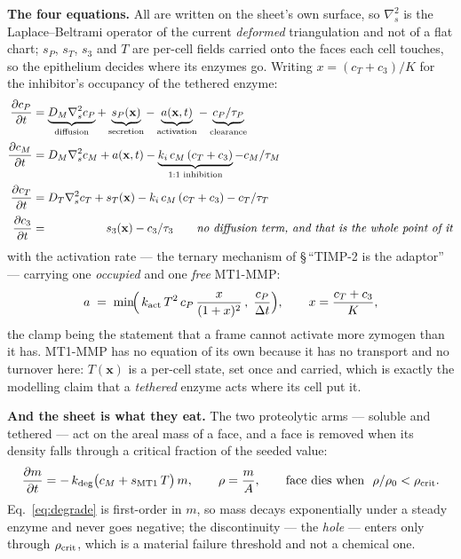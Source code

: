 \textbf{The four equations.} All are written on the sheet's own surface, so $\nabla_s^2$ is the
Laplace--Beltrami operator of the current \emph{deformed} triangulation and not of a flat chart; $s_P$,
$s_T$, $s_3$ and $T$ are per-cell fields carried onto the faces each cell touches, so the epithelium
decides where its enzymes go. Writing $x=(c_T+c_3)/K$ for the inhibitor's occupancy of the tethered
enzyme:
%
\begin{align}
\frac{\partial c_P}{\partial t}
  &= \underbrace{D_M\nabla_s^2 c_P}_{\text{diffusion}}
   + \underbrace{s_P(\mathbf x)}_{\text{secretion}}
   - \underbrace{a(\mathbf x,t)}_{\text{activation}}
   - \underbrace{c_P/\tau_P}_{\text{clearance}} \label{eq:pro}\\[2pt]
\frac{\partial c_M}{\partial t}
  &= D_M\nabla_s^2 c_M
   + a(\mathbf x,t)
   - \underbrace{k_i\,c_M\,(c_T+c_3)}_{\text{1:1 inhibition}}
   - c_M/\tau_M \label{eq:mmp}\\[2pt]
\frac{\partial c_T}{\partial t}
  &= D_T\nabla_s^2 c_T + s_T(\mathbf x) - k_i\,c_M\,(c_T+c_3) - c_T/\tau_T \label{eq:timp}\\[2pt]
\frac{\partial c_3}{\partial t}
  &= \phantom{D_T\nabla_s^2 c_T +{}} s_3(\mathbf x) - c_3/\tau_3
   \qquad\text{\emph{no diffusion term, and that is the whole point of it}} \label{eq:timp3}
\end{align}
%
with the activation rate --- the ternary mechanism of \S\,``TIMP-2 is the adaptor'' --- carrying one
\emph{occupied} and one \emph{free} MT1-MMP:
%
\begin{equation}
a \;=\; \min\!\Bigl(\,k_{\rm act}\,T^2\,c_P\,\frac{x}{(1+x)^2}\,,\;\frac{c_P}{\Delta t}\Bigr),
\qquad x=\frac{c_T+c_3}{K},
\label{eq:act}
\end{equation}
%
the clamp being the statement that a frame cannot activate more zymogen than it has. MT1-MMP has no
equation of its own because it has no transport and no turnover here: $T(\mathbf x)$ is a per-cell
state, set once and carried, which is exactly the modelling claim that a \emph{tethered} enzyme acts
where its cell put it.

\textbf{And the sheet is what they eat.} The two proteolytic arms --- soluble and tethered --- act on
the areal mass of a face, and a face is removed when its density falls through a critical fraction of
the seeded value:
%
\begin{equation}
\frac{\partial m}{\partial t} = -\,k_{\rm deg}\bigl(c_M + s_{\rm MT1}\,T\bigr)\,m,
\qquad
\rho = \frac{m}{A},\qquad
\text{face dies when }\ \rho/\rho_0 < \rho_{\rm crit}.
\label{eq:degrade}
\end{equation}
%
Eq.~\eqref{eq:degrade} is first-order in $m$, so mass decays exponentially under a steady enzyme and
never goes negative; the discontinuity --- the \emph{hole} --- enters only through $\rho_{\rm crit}$,
which is a material failure threshold and not a chemical one.

